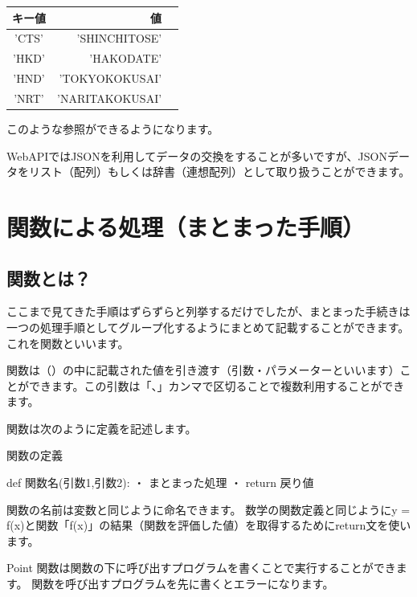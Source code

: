 \documentclass[11pt,a4paper,dvipdfmx,titlepage]{jsreport}
\begin{document}
\begin{center}
\begin{tabular}{|c|r|r|} 
\hline
 キー値& 値 \\ \hline \hline
 'CTS' &  'SHINCHITOSE' \\ \hline
 'HKD' &  'HAKODATE' \\ \hline
 'HND' &  'TOKYOKOKUSAI' \\ \hline
 'NRT' &  'NARITAKOKUSAI' \\ \hline
\end{tabular}
\end{center}

このような参照ができるようになります。

WebAPIではJSONを利用してデータの交換をすることが多いですが、JSONデータをリスト（配列）もしくは辞書（連想配列）として取り扱うことができます。

\section{関数による処理（まとまった手順）}
\subsection{関数とは？}
ここまで見てきた手順はずらずらと列挙するだけでしたが、まとまった手続きは一つの処理手順としてグループ化するようにまとめて記載することができます。
これを関数といいます。

関数は（）の中に記載された値を引き渡す（引数・パラメーターといいます）ことができます。この引数は「、」カンマで区切ることで複数利用することができます。

関数は次のように定義を記述します。
\begin{grabox}{関数の定義}
\begin{listing}{1}
def 関数名(引数1,引数2):
    ・
    まとまった処理
    ・
    return 戻り値
\end{listing}
\end{grabox}

関数の名前は変数と同じように命名できます。
数学の関数定義と同じようにy = f(x)と関数「f(x)」の結果（関数を評価した値）を取得するためにreturn文を使います。
\begin{hipoint}{Point}
関数は関数の下に呼び出すプログラムを書くことで実行することができます。
関数を呼び出すプログラムを先に書くとエラーになります。
\end{hipoint}
\end{document}
